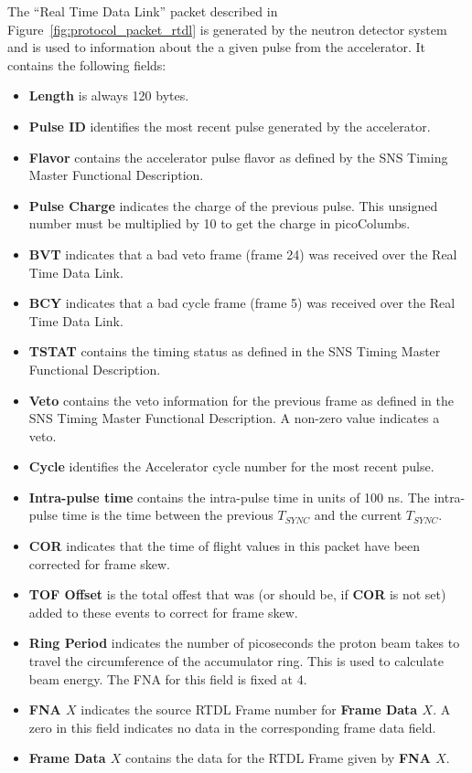 The ``Real Time Data Link'' packet described in
Figure~\ref{fig:protocol_packet_rtdl} is generated by the neutron
detector system and is used to information about the a given pulse
from the accelerator.  It contains the following fields:
\begin{itemize}
\item{\bf Length} is always 120 bytes.
\item{\bf Pulse ID} identifies the most recent pulse generated by the
accelerator.
\item{\bf Flavor} contains the accelerator pulse flavor as defined by
the SNS Timing Master Functional Description.
\item{\bf Pulse Charge} indicates the charge of the previous pulse. This
unsigned number must be multiplied by 10 to get the charge in picoColumbs.
\item{\bf BVT} indicates that a bad veto frame (frame 24) was received over the
Real Time Data Link.
\item{\bf BCY} indicates that a bad cycle frame (frame 5) was received over the Real Time Data Link.
\item{\bf TSTAT} contains the timing status as defined in the SNS Timing Master
Functional Description.
\item{\bf Veto} contains the veto information for the previous frame as defined
in the SNS Timing Master Functional Description. A non-zero value indicates
a veto.
\item{\bf Cycle} identifies the Accelerator cycle number for the most
recent pulse.
\item{\bf Intra-pulse time} contains the intra-pulse time in units of 100 ns.
The intra-pulse time is the time between the previous $T_{SYNC}$ and the
current $T_{SYNC}$.
\item{\bf COR} indicates that the time of flight values in this packet have
been corrected for frame skew.
\item{\bf TOF Offset} is the total offest that was (or should be, if {\bf COR}
is not set) added to these events to correct for frame skew.
\item{\bf Ring Period} indicates the number of picoseconds the proton beam
takes to travel the circumference of the accumulator ring. This is used
to calculate beam energy. The FNA for this field is fixed at 4.
\item{\bf FNA $X$} indicates the source RTDL Frame number for
{\bf Frame Data $X$}. A zero in this field indicates no data in
the corresponding frame data field.
\item{\bf Frame Data $X$} contains the data for the RTDL Frame given by
{\bf FNA $X$}.
\end{itemize}


